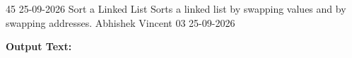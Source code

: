 \clearpage
\label{prog:45}
\programhead
  {45}
  {25-09-2026}
  {Sort a Linked List}
  {Sorts a linked list by swapping values and by swapping addresses.}
  {Abhishek Vincent}
  {03}
  {25-09-2026}

\divider
\textbf{Output Text:}\par
\vspace{2pt}

